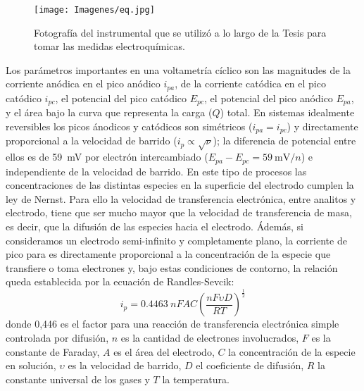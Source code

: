 	 		\begin{figure}[ht!]
			 		  \begin{center}
			 		  \texttt{[image: Imagenes/eq.jpg]}
			 		  \caption[Equipo para realizar la medidas electroquímicas]{Fotografía del instrumental que se utilizó a lo largo de la Tesis para tomar las medidas electroquímicas.}
			 		  \label{esq:eq}
			 		  \end{center}
			 		  \end{figure}		
	
	 Los parámetros importantes en una voltametría cíclico son las magnitudes de la corriente anódica en el pico anódico $i_{pa}$, de la corriente catódica en el pico catódico $i_{pc}$, el potencial del pico catódico $E_{pc}$, el potencial del pico anódico $E_{pa}$, y el área bajo la curva que representa la carga ($Q$) total. 
	 En sistemas idealmente reversibles los picos ánodicos y catódicos son simétricos ($i_{pa}=i_{pc}$) y directamente proporcional a la velocidad de barrido ($i_p \propto \sqrt{\nu}$); la diferencia de potencial entre ellos es de \SI{59}{\milli\volt} por electrón intercambiado ($E_{pa}-E_{pc}=\SI{59}{\milli\volt\per n}$) e independiente de la velocidad de barrido. En este tipo de procesos las concentraciones de las distintas especies en la superficie del electrodo cumplen la ley de Nernst.\cite{Wi2000,Villullas2000,Gosser}
	 Para ello la velocidad de transferencia electrónica, entre analitos y electrodo, tiene que ser mucho mayor que la velocidad de transferencia de masa, es decir, que la difusión de las especies hacia el electrodo. Ádemás, si consideramos un electrodo semi-infinito y completamente plano, la corriente de pico para es directamente proporcional a la concentración de la especie que transfiere o toma electrones y, bajo estas condiciones de contorno, la relación queda establecida por la ecuación de Randles-Sevcik:
				\begin{equation}
					i_p=0.4463\: nFAC \left(\frac{nF\upsilon D}{RT}\right)^{\frac{1}{2}}
					\label{eq:randles-sevnic}
				\end{equation}
	 donde 0,446 es el factor para una reacción de transferencia electrónica simple controlada por difusión, $n$ es la cantidad de electrones involucrados, $F$ es la constante de Faraday, $A$ es el área del electrodo, $C$ la concentración de la especie en solución, $\upsilon$ es la velocidad de barrido, $D$ el coeficiente de difusión, $R$ la constante universal de los gases y $T$ la temperatura.

